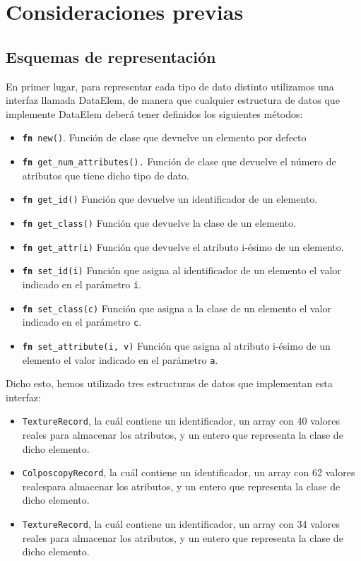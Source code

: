 \documentclass[size=a4, parskip=half, titlepage=false, toc=flat, toc=bib, 12pt]{scrartcl}
\begin{document}
\section{Consideraciones previas}
\subsection{Esquemas de representación}
En primer lugar, para representar cada tipo de dato distinto utilizamos una interfaz llamada DataElem, de manera que cualquier estructura de datos que implemente DataElem deberá tener definidos los siguientes métodos:
\begin{itemize}
    \item \texttt{\textbf{fn} new()}. Función de clase que devuelve un elemento por defecto
    \item \texttt{\textbf{fn} get\_num\_attributes().} Función de clase que devuelve el número de atributos que tiene dicho tipo de dato.
    \item \texttt{\textbf{fn} get\_id()}  Función que devuelve un identificador de un elemento.
    \item \texttt{\textbf{fn} get\_class()} Función que devuelve la clase de un elemento.
    \item \texttt{\textbf{fn} get\_attr(i)} Función que devuelve el atributo i-ésimo de un elemento.
    \item \texttt{\textbf{fn} set\_id(i)} Función que asigna al identificador de un elemento el valor indicado en el parámetro \texttt{i}.
    \item \texttt{\textbf{fn} set\_class(c)} Función que asigna a la clase de un elemento el valor indicado en el parámetro \texttt{c}.
    \item \texttt{\textbf{fn} set\_attribute(i, v)} Función que asigna al atributo i-ésimo de un elemento el valor indicado en el parámetro \texttt{a}.
\end{itemize}

Dicho esto, hemos utilizado tres estructuras de datos que implementan esta interfaz:
\begin{itemize}
    \item \texttt{TextureRecord}, la cuál contiene un identificador, un array con 40 valores reales para almacenar los atributos, y un entero que representa la clase de dicho elemento.
    \item \texttt{ColposcopyRecord}, la cuál contiene un identificador, un array con 62 valores realespara almacenar los atributos, y un entero que representa la clase de dicho elemento.
    \item \texttt{TextureRecord}, la cuál contiene un identificador, un array con 34 valores reales para almacenar los atributos, y un entero que representa la clase de dicho elemento.
\end{itemize}
\end{document}
